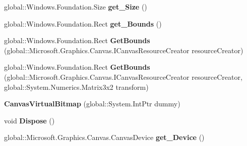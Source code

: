 \begin{DoxyCompactItemize}
global\+::\+Windows.\+Foundation.\+Size {\bfseries get\+\_\+\+Size} ()
\item 
\mbox{\label{class_microsoft_1_1_graphics_1_1_canvas_1_1_canvas_virtual_bitmap_a6664a6235d655fc26b219ad204fef7ae}} 
global\+::\+Windows.\+Foundation.\+Rect {\bfseries get\+\_\+\+Bounds} ()
\item 
\mbox{\label{class_microsoft_1_1_graphics_1_1_canvas_1_1_canvas_virtual_bitmap_a23dbbaf8b46875ac886417621e2ffd2e}} 
global\+::\+Windows.\+Foundation.\+Rect {\bfseries Get\+Bounds} (global\+::\+Microsoft.\+Graphics.\+Canvas.\+I\+Canvas\+Resource\+Creator resource\+Creator)
\item 
\mbox{\label{class_microsoft_1_1_graphics_1_1_canvas_1_1_canvas_virtual_bitmap_aaa158707cfd84b8d995986896e041c86}} 
global\+::\+Windows.\+Foundation.\+Rect {\bfseries Get\+Bounds} (global\+::\+Microsoft.\+Graphics.\+Canvas.\+I\+Canvas\+Resource\+Creator resource\+Creator, global\+::\+System.\+Numerics.\+Matrix3x2 transform)
\item 
\mbox{\label{class_microsoft_1_1_graphics_1_1_canvas_1_1_canvas_virtual_bitmap_aeaea1d4461bcea11a0a08b9543be5651}} 
{\bfseries Canvas\+Virtual\+Bitmap} (global\+::\+System.\+Int\+Ptr dummy)
\item 
\mbox{\label{class_microsoft_1_1_graphics_1_1_canvas_1_1_canvas_virtual_bitmap_aaf949a1a2cfd013fee6beb63ae18107c}} 
void {\bfseries Dispose} ()
\item 
\mbox{\label{class_microsoft_1_1_graphics_1_1_canvas_1_1_canvas_virtual_bitmap_add2a220c3a0d0912f49273fd03bc60ef}} 
global\+::\+Microsoft.\+Graphics.\+Canvas.\+Canvas\+Device {\bfseries get\+\_\+\+Device} ()
\item 
\mbox{\label{class_microsoft_1_1_graphics_1_1_canvas_1_1_canvas_virtual_bitmap_a37a9831f455bc5cc3a218d38d784c58a}} 

\end{DoxyCompactItemize}
